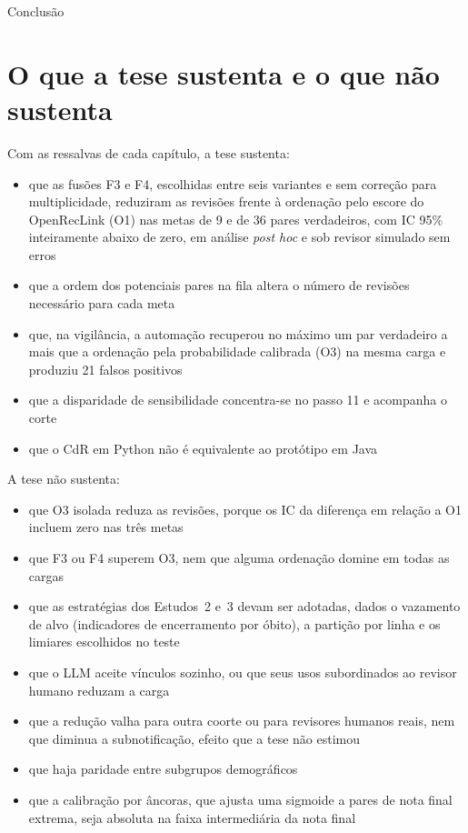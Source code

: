\begin{chapter}{Conclusão}
\section{O que a tese sustenta e o que não sustenta}\label{sec:concl-sustenta}

Com as ressalvas de cada capítulo, a tese sustenta:

\begin{itemize}
\item que as fusões F3 e F4, escolhidas entre seis variantes e sem correção para multiplicidade, reduziram as revisões frente à ordenação pelo escore do OpenRecLink (O1) nas metas de 9 e de 36 pares verdadeiros, com IC 95\% inteiramente abaixo de zero, em análise \textit{post hoc} e sob revisor simulado sem erros
\item que a ordem dos potenciais pares na fila altera o número de revisões necessário para cada meta
\item que, na vigilância, a automação recuperou no máximo um par verdadeiro a mais que a ordenação pela probabilidade calibrada (O3) na mesma carga e produziu 21 falsos positivos
\item que a disparidade de sensibilidade concentra-se no passo 11 e acompanha o corte
\item que o CdR em Python não é equivalente ao protótipo em Java
\end{itemize}

A tese não sustenta:

\begin{itemize}
\item que O3 isolada reduza as revisões, porque os IC da diferença em relação a O1 incluem zero nas três metas
\item que F3 ou F4 superem O3, nem que alguma ordenação domine em todas as cargas
\item que as estratégias dos Estudos~2 e~3 devam ser adotadas, dados o vazamento de alvo (indicadores de encerramento por óbito), a partição por linha e os limiares escolhidos no teste
\item que o LLM aceite vínculos sozinho, ou que seus usos subordinados ao revisor humano reduzam a carga
\item que a redução valha para outra coorte ou para revisores humanos reais, nem que diminua a subnotificação, efeito que a tese não estimou
\item que haja paridade entre subgrupos demográficos
\item que a calibração por âncoras, que ajusta uma sigmoide a pares de nota final extrema, seja absoluta na faixa intermediária da nota final
\end{itemize}


\end{chapter}

